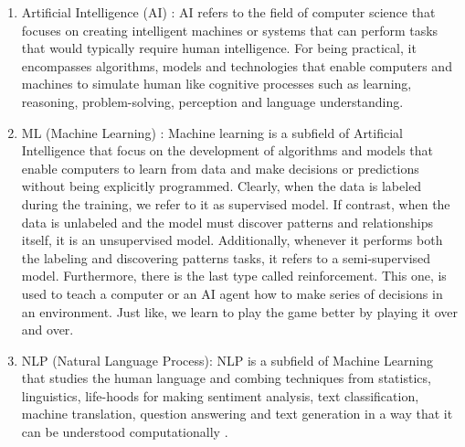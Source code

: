 \documentclass[12pt,a4paper]{report}
\begin{document}
\begin{enumerate}[label=\alph*)]
		\item Artificial Intelligence (AI) :
		 AI refers to the field of computer science that focuses on creating intelligent machines or systems that can perform tasks that would typically require human intelligence. For being practical, it encompasses algorithms, models and technologies that enable computers and machines to simulate human like cognitive processes such as learning, reasoning, problem-solving, perception and language understanding.  
		 
		 \item ML (Machine Learning)  : 
		 Machine learning is a subfield of Artificial Intelligence that focus on the development of algorithms and models that enable computers to learn from data and make decisions or predictions without being explicitly programmed\cite{smola2010introduction}. Clearly, when the data is labeled during the training, we refer to it as supervised model. If contrast, when the data is unlabeled and the model must discover patterns and relationships itself, it is an unsupervised model. Additionally, whenever it performs both the labeling  and discovering patterns tasks, it refers to a semi-supervised model. Furthermore, there is the last type called reinforcement. This one, is used to teach a computer or an AI agent how to make series of decisions in an environment. Just like, we learn to play the game better by playing it over and over.   
		 
		 \item NLP (Natural Language Process):
		 NLP is a subfield of Machine Learning that studies the human language and combing techniques from statistics, linguistics, life-hoods for making sentiment analysis, text classification, machine translation, question answering and text generation in a way that it can be understood computationally \cite{cambria2014jumping}. 
		  \end{enumerate}
\end{document}
